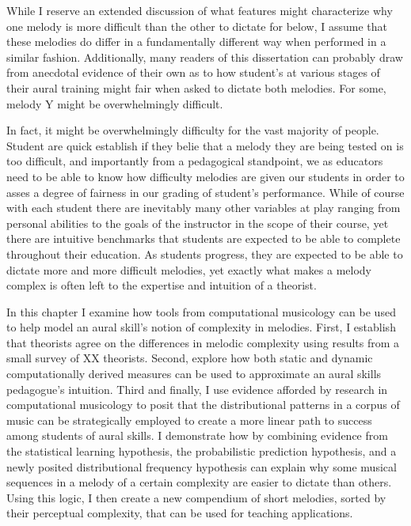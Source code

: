 \documentclass[]{book}
\begin{document}
While I reserve an extended discussion of what features might characterize why one melody is more difficult than the other to dictate for below, I assume that these melodies do differ in a fundamentally different way when performed in a similar fashion.
Additionally, many readers of this dissertation can probably draw from anecdotal evidence of their own as to how student's at various stages of their aural training might fair when asked to dictate both melodies.
For some, melody Y might be overwhelmingly difficult.

In fact, it might be overwhelmingly difficulty for the vast majority of people.
Student are quick establish if they belie that a melody they are being tested on is too difficult, and importantly from a pedagogical standpoint, we as educators need to be able to know how difficulty melodies are given our students in order to asses a degree of fairness in our grading of student's performance.
While of course with each student there are inevitably many other variables at play ranging from personal abilities to the goals of the instructor in the scope of their course, yet there are intuitive benchmarks that students are expected to be able to complete throughout their education.
As students progress, they are expected to be able to dictate more and more difficult melodies, yet exactly what makes a melody complex is often left to the expertise and intuition of a theorist.

In this chapter I examine how tools from computational musicology can be used to help model an aural skill's notion of complexity in melodies.
First, I establish that theorists agree on the differences in melodic complexity using results from a small survey of XX theorists.
Second, explore how both static and dynamic computationally derived measures can be used to approximate an aural skills pedagogue's intuition.
Third and finally, I use evidence afforded by research in computational musicology to posit that the distributional patterns in a corpus of music can be strategically employed to create a more linear path to success among students of aural skills.
I demonstrate how by combining evidence from the statistical learning hypothesis, the probabilistic prediction hypothesis, and a newly posited distributional frequency hypothesis can explain why some musical sequences in a melody of a certain complexity are easier to dictate than others.
Using this logic, I then create a new compendium of short melodies, sorted by their perceptual complexity, that can be used for teaching applications.
\end{document}

